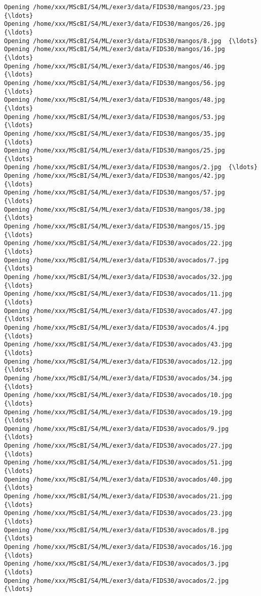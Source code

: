 \documentclass[11pt]{article}
\begin{document}
\begin{Verbatim}[commandchars=\\\{\}]
Opening /home/xxx/MScBI/S4/ML/exer3/data/FIDS30/mangos/23.jpg  {\ldots}
Opening /home/xxx/MScBI/S4/ML/exer3/data/FIDS30/mangos/26.jpg  {\ldots}
Opening /home/xxx/MScBI/S4/ML/exer3/data/FIDS30/mangos/8.jpg  {\ldots}
Opening /home/xxx/MScBI/S4/ML/exer3/data/FIDS30/mangos/16.jpg  {\ldots}
Opening /home/xxx/MScBI/S4/ML/exer3/data/FIDS30/mangos/46.jpg  {\ldots}
Opening /home/xxx/MScBI/S4/ML/exer3/data/FIDS30/mangos/56.jpg  {\ldots}
Opening /home/xxx/MScBI/S4/ML/exer3/data/FIDS30/mangos/48.jpg  {\ldots}
Opening /home/xxx/MScBI/S4/ML/exer3/data/FIDS30/mangos/53.jpg  {\ldots}
Opening /home/xxx/MScBI/S4/ML/exer3/data/FIDS30/mangos/35.jpg  {\ldots}
Opening /home/xxx/MScBI/S4/ML/exer3/data/FIDS30/mangos/25.jpg  {\ldots}
Opening /home/xxx/MScBI/S4/ML/exer3/data/FIDS30/mangos/2.jpg  {\ldots}
Opening /home/xxx/MScBI/S4/ML/exer3/data/FIDS30/mangos/42.jpg  {\ldots}
Opening /home/xxx/MScBI/S4/ML/exer3/data/FIDS30/mangos/57.jpg  {\ldots}
Opening /home/xxx/MScBI/S4/ML/exer3/data/FIDS30/mangos/38.jpg  {\ldots}
Opening /home/xxx/MScBI/S4/ML/exer3/data/FIDS30/mangos/15.jpg  {\ldots}
Opening /home/xxx/MScBI/S4/ML/exer3/data/FIDS30/avocados/22.jpg  {\ldots}
Opening /home/xxx/MScBI/S4/ML/exer3/data/FIDS30/avocados/7.jpg  {\ldots}
Opening /home/xxx/MScBI/S4/ML/exer3/data/FIDS30/avocados/32.jpg  {\ldots}
Opening /home/xxx/MScBI/S4/ML/exer3/data/FIDS30/avocados/11.jpg  {\ldots}
Opening /home/xxx/MScBI/S4/ML/exer3/data/FIDS30/avocados/47.jpg  {\ldots}
Opening /home/xxx/MScBI/S4/ML/exer3/data/FIDS30/avocados/4.jpg  {\ldots}
Opening /home/xxx/MScBI/S4/ML/exer3/data/FIDS30/avocados/43.jpg  {\ldots}
Opening /home/xxx/MScBI/S4/ML/exer3/data/FIDS30/avocados/12.jpg  {\ldots}
Opening /home/xxx/MScBI/S4/ML/exer3/data/FIDS30/avocados/34.jpg  {\ldots}
Opening /home/xxx/MScBI/S4/ML/exer3/data/FIDS30/avocados/10.jpg  {\ldots}
Opening /home/xxx/MScBI/S4/ML/exer3/data/FIDS30/avocados/19.jpg  {\ldots}
Opening /home/xxx/MScBI/S4/ML/exer3/data/FIDS30/avocados/9.jpg  {\ldots}
Opening /home/xxx/MScBI/S4/ML/exer3/data/FIDS30/avocados/27.jpg  {\ldots}
Opening /home/xxx/MScBI/S4/ML/exer3/data/FIDS30/avocados/51.jpg  {\ldots}
Opening /home/xxx/MScBI/S4/ML/exer3/data/FIDS30/avocados/40.jpg  {\ldots}
Opening /home/xxx/MScBI/S4/ML/exer3/data/FIDS30/avocados/21.jpg  {\ldots}
Opening /home/xxx/MScBI/S4/ML/exer3/data/FIDS30/avocados/23.jpg  {\ldots}
Opening /home/xxx/MScBI/S4/ML/exer3/data/FIDS30/avocados/8.jpg  {\ldots}
Opening /home/xxx/MScBI/S4/ML/exer3/data/FIDS30/avocados/16.jpg  {\ldots}
Opening /home/xxx/MScBI/S4/ML/exer3/data/FIDS30/avocados/3.jpg  {\ldots}
Opening /home/xxx/MScBI/S4/ML/exer3/data/FIDS30/avocados/2.jpg  {\ldots}

\end{Verbatim}
\end{document}
